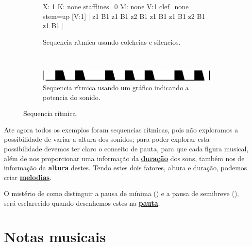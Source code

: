\begin{figure}[h]
    \centering
    \begin{subfigure}[b]{0.9\textwidth}
 \begin{abc}[name=abc-figurasexample2]
%
X: 1 %
K: none stafflines=0 %
M:  none %
V:1 clef=none stem=up %
%
[V:1] | z1 B1 z1 B1 z2 B1 z1 B1 z1 B1 z2 B1  z1 B1   |
%       
\end{abc}
	\caption{Sequencia rítmica usando  colcheias e silencios.}
	\label{fig:abc-figurasexample2}
    \end{subfigure}
    ~%
    \begin{subfigure}[b]{0.9\textwidth}
        \includegraphics[width=\textwidth]{chapters/cap-musica-basica/forma-figurasexample2.eps}
        \caption{Sequencia rítmica usando um gráfico indicando a potencia do sonido.}
        \label{fig:forma-figurasexample2}
    \end{subfigure}
    \caption{Sequencia rítmica.}\label{fig:total-figurasexample2}
\end{figure}


Ate agora todos os exemplos foram sequencias rítmicas, 
pois não exploramos a possibilidade de variar a altura dos sonidos;
para poder explorar esta possibilidade devemos ter claro o conceito de pauta,
para que cada figura musical, 
além de nos proporcionar uma informação da \hyperref[sec:pos:Duracion]{\textbf{duração}}  dos sons, 
também nos de informação da \hyperref[sec:pos:Altura]{\textbf{altura}}  destes. 
Tendo estes dois fatores, altura e duração, podemos criar \hyperref[sec:pos:Melodia]{\textbf{melodias}}.

\begin{remark}
O mistério de como distinguir a pausa de mínima (\HaPa) e a pausa de semibreve (\GaPa),
será esclarecido quando desenhemos estes na \hyperref[sec:pauta]{\textbf{pauta}}.
\end{remark}

\section{Notas musicais}
\label{sec:notasmusicais}

